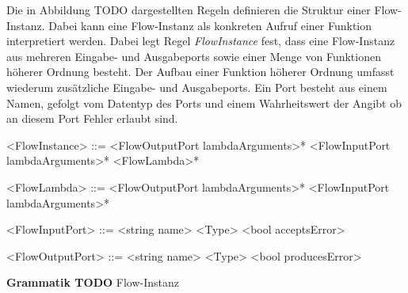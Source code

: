 \documentclass{article}
\begin{document}
    Die in Abbildung TODO dargestellten Regeln definieren die Struktur einer Flow-Instanz. Dabei kann eine Flow-Instanz als konkreten Aufruf einer Funktion interpretiert werden. 
    Dabei legt Regel \textit{FlowInstance} fest, dass eine Flow-Instanz aus mehreren Eingabe- und Ausgabeports sowie einer Menge von Funktionen höherer Ordnung besteht.
    Der Aufbau einer Funktion höherer Ordnung umfasst wiederum zusätzliche Eingabe- und Ausgabeports.
    Ein Port besteht aus einem Namen, gefolgt vom Datentyp des Ports und einem Wahrheitswert der Angibt ob an diesem Port Fehler erlaubt sind.
    \begin{grammar}
        <FlowInstance> ::= <FlowOutputPort lambdaArguments>* <FlowInputPort lambdaArguments>* <FlowLambda>*
        
        <FlowLambda> ::= <FlowOutputPort lambdaArguments>* <FlowInputPort lambdaArguments>*

        <FlowInputPort> ::= <string name> <Type> <bool acceptsError>

        <FlowOutputPort> ::= <string name> <Type> <bool producesError>
    \end{grammar}
    \textbf{Grammatik TODO} Flow-Instanz\\
    \\
\end{document}
